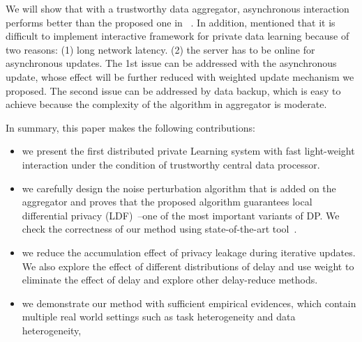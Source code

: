 We will show that with a trustworthy data aggregator, asynchronous interaction performs better than the proposed one in~\cite{smith2017interaction} . In addition, \cite{smith2017interaction} mentioned that it is difficult to implement interactive framework for private data learning because of two reasons: (1) long network latency. (2) the server has to be online for asynchronous updates. The 1st issue can be addressed with the asynchronous update, whose effect will be further reduced with weighted update mechanism we proposed. The second issue can be addressed by data backup, which is easy to achieve because the complexity of the algorithm in aggregator is moderate.

In summary, this paper makes the following contributions:
\begin{itemize}
  \item we present the first distributed private Learning system with fast light-weight interaction under the condition of trustworthy central data processor.
  \item we carefully design the noise perturbation algorithm that is added on the aggregator and proves that the proposed algorithm guarantees local differential privacy (LDF)~\cite{duchi2013local}--one of the most important variants of DP. We check the correctness of our method using state-of-the-art tool~\cite{ding2018toward}.
  \item we reduce the accumulation effect of privacy leakage during iterative updates. We also explore the effect of different distributions of delay and use weight to eliminate the effect of delay and explore other delay-reduce methods.
  \item we demonstrate our method with sufficient empirical evidences, which contain multiple real world settings such as task heterogeneity and data heterogeneity, 
\end{itemize}

